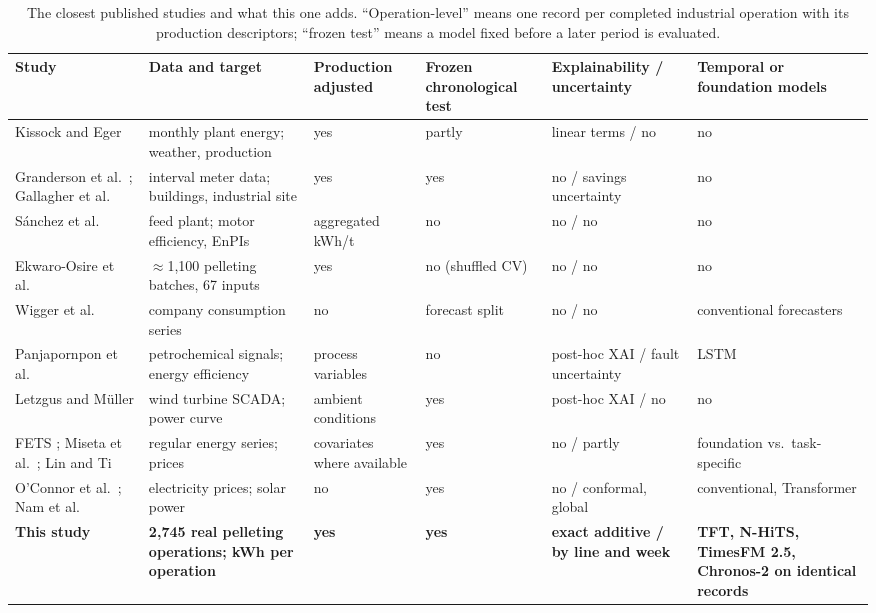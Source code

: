 \begin{table}[!htbp]\centering\scriptsize\setlength{\tabcolsep}{3pt}\renewcommand{\arraystretch}{1.08}
\caption{The closest published studies and what this one adds. ``Operation-level'' means one record per completed industrial operation with its production descriptors; ``frozen test'' means a model fixed before a later period is evaluated.}\label{tab:related}
\begin{tabularx}{\linewidth}{@{}>{\raggedright\arraybackslash}p{.19\linewidth}>{\raggedright\arraybackslash}p{.21\linewidth}>{\raggedright\arraybackslash}p{.11\linewidth}>{\raggedright\arraybackslash}p{.10\linewidth}>{\raggedright\arraybackslash}p{.16\linewidth}>{\raggedright\arraybackslash}X@{}}\toprule
Study & Data and target & Production adjusted & Frozen chrono\-logical test & Explainability / uncertainty & Temporal or foundation models \\\midrule
Kissock and Eger \citep{kissock2008} & monthly plant energy; weather, production & yes & partly & linear terms / no & no \\
Granderson et al.\ \citep{granderson2016}; Gallagher et al.\ \citep{gallagher2018} & interval meter data; buildings, industrial site & yes & yes & no / savings uncertainty & no \\
S\'anchez et al.\ \citep{sanchez2020} & feed plant; motor efficiency, EnPIs & aggregated kWh/t & no & no / no & no \\
Ekwaro-Osire et al.\ \citep{ekwaro2025} & $\approx$1,100 pelleting batches, 67 inputs & yes & no (shuffled CV) & no / no & no \\
Wigger et al.\ \citep{wigger2025} & company consumption series & no & forecast split & no / no & conventional forecasters \\
Panjapornpon et al.\ \citep{panjapornpon2023} & petrochemical signals; energy efficiency & process variables & no & post-hoc XAI / fault uncertainty & LSTM \\
Letzgus and M\"uller \citep{letzgus2024} & wind turbine SCADA; power curve & ambient conditions & yes & post-hoc XAI / no & no \\
FETS \citep{obermeier2026}; Miseta et al.\ \citep{miseta2026}; Lin and Ti \citep{lin2026} & regular energy series; prices & covariates where available & yes & no / partly & foundation vs.\ task-specific \\
O'Connor et al.\ \citep{oconnor2025}; Nam et al.\ \citep{nam2025} & electricity prices; solar power & no & yes & no / conformal, global & conventional, Transformer \\
\textbf{This study} & \textbf{2,745 real pelleting operations; kWh per operation} & \textbf{yes} & \textbf{yes} & \textbf{exact additive / by line and week} & \textbf{TFT, N-HiTS, TimesFM 2.5, Chronos-2 on identical records} \\\bottomrule
\end{tabularx}
\end{table}

